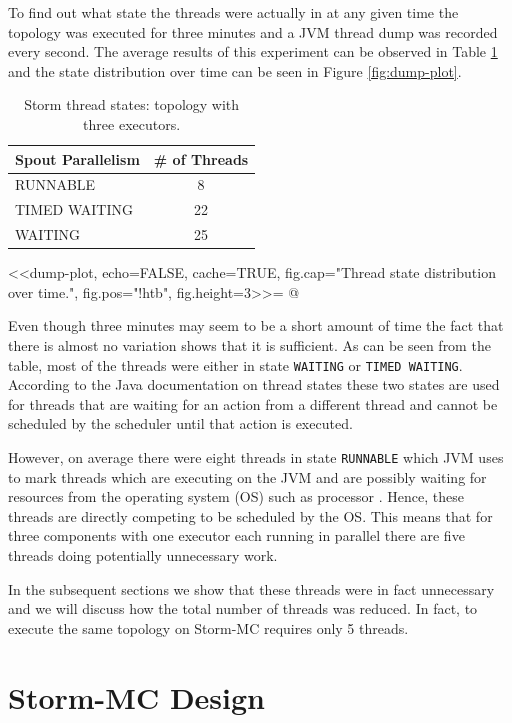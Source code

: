 To find out what state the threads were actually in at any given time the topology was executed for three minutes and a JVM thread dump was recorded every second. The average results of this experiment can be observed in Table \ref{table:dump} and the state distribution over time can be seen in Figure \ref{fig:dump-plot}.

\begin{table}[htb!]
\centering
\small
\begin{tabular}{@{}lc@{}}
    \textbf{Spout Parallelism} & \textbf{\# of Threads} \\ \toprule
    RUNNABLE & 8  \\
	TIMED WAITING & 22  \\
    WAITING & 25  \\
\end{tabular}
\caption[Storm thread states.]{Storm thread states: topology with three executors.}
\label{table:dump}
\end{table}

<<dump-plot, echo=FALSE, cache=TRUE, fig.cap="Thread state distribution over time.", fig.pos="!htb", fig.height=3>>=
@

Even though three minutes may seem to be a short amount of time the fact that there is almost no variation shows that it is sufficient. As can be seen from the table, most of the threads were either in state \texttt{WAITING} or \texttt{TIMED WAITING}. According to the Java documentation on thread states \citep{JavaThreads} these two states are used for threads that are waiting for an action from a different thread and cannot be scheduled by the scheduler until that action is executed.

However, on average there were eight threads in state \texttt{RUNNABLE} which JVM uses to mark threads which are executing on the JVM and are possibly waiting for resources from the operating system (OS) such as processor \citep{JavaThreads}. Hence, these threads are directly competing to be scheduled by the OS. This means that for three components with one executor each running in parallel there are five threads doing potentially unnecessary work.

In the subsequent sections we show that these threads were in fact unnecessary and we will discuss how the total number of threads was reduced. In fact, to execute the same topology on Storm-MC requires only 5 threads.

\section{Storm-MC Design}
\label{sec:storm_mc_arch}

